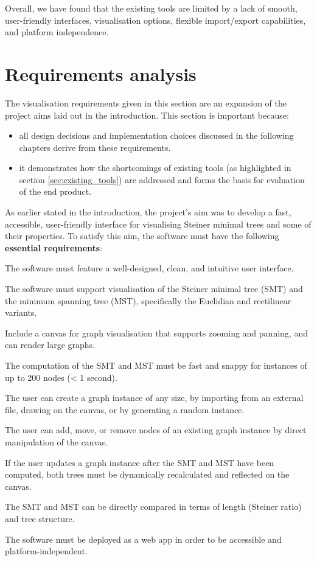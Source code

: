\documentclass{l4proj}
\begin{document}
Overall, we have found that the existing tools are limited by a lack of smooth, user-friendly interfaces, visualisation options, flexible import/export capabilities, and platform independence.

\chapter{Requirements analysis}
\label{sec:requirements}

The visualisation requirements given in this section are an expansion of the project aims laid out in the introduction. This section is important because:
\begin{itemize}
    \item all design decisions and implementation choices discussed in the following chapters derive from these requirements.
    \item it demonstrates how the shortcomings of existing tools (as highlighted in section \ref{sec:existing_tools}) are addressed and forms the basis for evaluation of the end product.
\end{itemize}
As earlier stated in the introduction, the project's aim was to develop a fast, accessible, user-friendly interface for visualising Steiner minimal trees and some of their properties.
To satisfy this aim, the software must have the following \textbf{essential requirements}:
\begin{requirements}
    \item The software must feature a well-designed, clean, and intuitive user interface.
    \item The software must support visualisation of the Steiner minimal tree (SMT) and the minimum spanning tree (MST), specifically the Euclidian and rectilinear variants.
    \item Include a canvas for graph visualisation that supports zooming and panning, and can render large graphs.
    \item The computation of the SMT and MST must be fast and snappy for instances of up to 200 nodes (< 1 second).
    \item The user can create a graph instance of any size, by importing from an external file, drawing on the canvas, or by generating a random instance.
    \item The user can add, move, or remove nodes of an existing graph instance by direct manipulation of the canvas.
    \item If the user updates a graph instance after the SMT and MST have been computed, both trees must be dynamically recalculated and reflected on the canvas.
    \item The SMT and MST can be directly compared in terms of length (Steiner ratio) and tree structure.
    \item The software must be deployed as a web app in order to be accessible and platform-independent.

\end{requirements}
\end{document}
